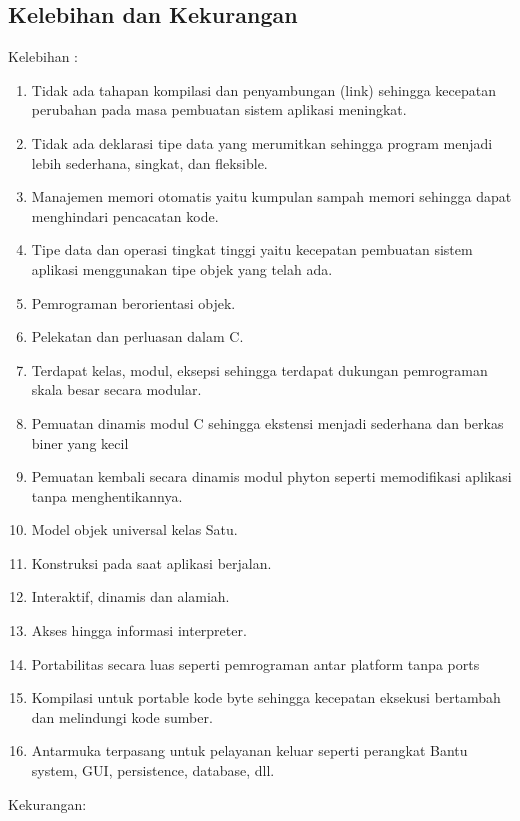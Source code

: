 \subsection{Kelebihan dan Kekurangan}
Kelebihan :
\begin{enumerate}
\item Tidak ada tahapan kompilasi dan penyambungan (link) sehingga kecepatan perubahan pada masa pembuatan sistem aplikasi meningkat. 
\item Tidak ada deklarasi tipe data yang merumitkan sehingga program menjadi lebih sederhana, singkat, dan fleksible.
\item Manajemen memori otomatis yaitu kumpulan sampah memori sehingga dapat menghindari pencacatan kode.
\item Tipe data dan operasi tingkat tinggi yaitu kecepatan pembuatan sistem aplikasi menggunakan tipe objek yang telah ada.
\item Pemrograman berorientasi objek. 
\item Pelekatan dan perluasan dalam C.
\item Terdapat kelas, modul, eksepsi sehingga terdapat dukungan pemrograman skala besar secara modular.
\item Pemuatan dinamis modul C sehingga ekstensi menjadi sederhana dan berkas biner yang kecil 
\item Pemuatan kembali secara dinamis modul phyton seperti memodifikasi aplikasi tanpa menghentikannya. 
\item Model objek universal kelas Satu.
\item Konstruksi pada saat aplikasi berjalan.
\item Interaktif, dinamis dan alamiah.
\item Akses hingga informasi interpreter.
\item Portabilitas secara luas seperti pemrograman antar platform tanpa ports
\item Kompilasi untuk portable kode byte sehingga kecepatan eksekusi bertambah dan melindungi kode sumber. 
\item Antarmuka terpasang untuk pelayanan keluar seperti perangkat Bantu system, GUI, persistence, database, dll.
\end{enumerate}
Kekurangan:
